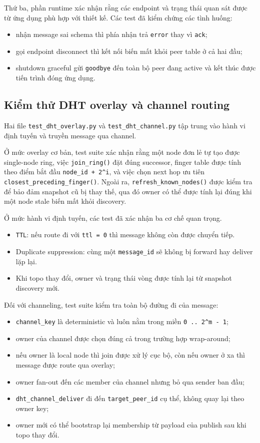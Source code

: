 Thứ ba, phần runtime xác nhận rằng các endpoint và trạng thái quan sát được từ ứng dụng phù hợp với thiết kế. Các test đã kiểm chứng các tình huống:
\begin{itemize}[leftmargin=2em]
    \item nhận message sai schema thì phía nhận trả \texttt{error} thay vì \texttt{ack};
    \item gọi endpoint disconnect thì kết nối biến mất khỏi peer table ở cả hai đầu;
    \item shutdown graceful gửi \texttt{goodbye} đến toàn bộ peer đang active và kết thúc được tiến trình đóng ứng dụng.
\end{itemize}

\subsection{Kiểm thử DHT overlay và channel routing}
Hai file \texttt{test\_dht\_overlay.py} và \texttt{test\_dht\_channel.py} tập trung vào hành vi định tuyến và truyền message qua channel.

Ở mức overlay cơ bản, test suite xác nhận rằng một node đơn lẻ tự tạo được single-node ring, việc \texttt{join\_ring()} đặt đúng successor, finger table được tính theo điểm bắt đầu \texttt{node\_id + 2\textasciicircum i}, và việc chọn next hop ưu tiên \texttt{closest\_preceding\_finger()}. Ngoài ra, \texttt{refresh\_known\_nodes()} được kiểm tra để bảo đảm snapshot cũ bị thay thế, qua đó owner có thể được tính lại đúng khi một node stale biến mất khỏi discovery.

Ở mức hành vi định tuyến, các test đã xác nhận ba cơ chế quan trọng.
\begin{itemize}[leftmargin=2em]
    \item \texttt{TTL}: nếu route đi với \texttt{ttl = 0} thì message không còn được chuyển tiếp.
    \item Duplicate suppression: cùng một \texttt{message\_id} sẽ không bị forward hay deliver lặp lại.
    \item Khi topo thay đổi, owner và trạng thái vòng được tính lại từ snapshot discovery mới.
\end{itemize}

Đối với channeling, test suite kiểm tra toàn bộ đường đi của message:
\begin{itemize}[leftmargin=2em]
    \item \texttt{channel\_key} là deterministic và luôn nằm trong miền \texttt{0 .. 2\textasciicircum m - 1};
    \item owner của channel được chọn đúng cả trong trường hợp wrap-around;
    \item nếu owner là local node thì join được xử lý cục bộ, còn nếu owner ở xa thì message được route qua overlay;
    \item owner fan-out đến các member của channel nhưng bỏ qua sender ban đầu;
    \item \texttt{dht\_channel\_deliver} đi đến \texttt{target\_peer\_id} cụ thể, không quay lại theo owner key;
    \item owner mới có thể bootstrap lại membership từ payload của publish sau khi topo thay đổi.
\end{itemize}


